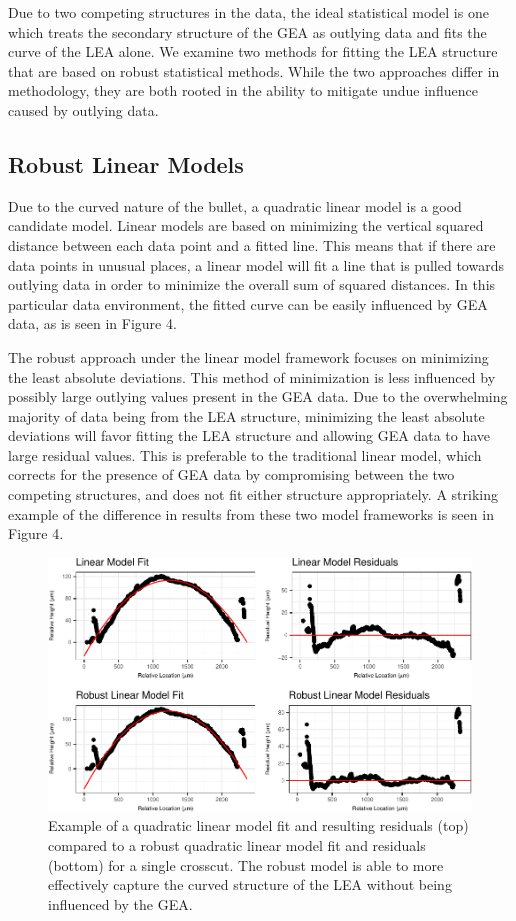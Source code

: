 \documentclass[12pt]{article}
\begin{document}
Due to two competing structures in the data, the ideal statistical model
is one which treats the secondary structure of the GEA as outlying data
and fits the curve of the LEA alone. We examine two methods for fitting
the LEA structure that are based on robust statistical methods. While
the two approaches differ in methodology, they are both rooted in the
ability to mitigate undue influence caused by outlying data.

\subsection{Robust Linear Models}

Due to the curved nature of the bullet, a quadratic linear model is a
good candidate model. Linear models are based on minimizing the vertical
squared distance between each data point and a fitted line. This means
that if there are data points in unusual places, a linear model will fit
a line that is pulled towards outlying data in order to minimize the
overall sum of squared distances. In this particular data environment,
the fitted curve can be easily influenced by GEA data, as is seen in
Figure 4.

The robust approach under the linear model framework focuses on
minimizing the least absolute deviations. This method of minimization is
less influenced by possibly large outlying values present in the GEA
data. Due to the overwhelming majority of data being from the LEA
structure, minimizing the least absolute deviations will favor fitting
the LEA structure and allowing GEA data to have large residual values.
This is preferable to the traditional linear model, which corrects for
the presence of GEA data by compromising between the two competing
structures, and does not fit either structure appropriately. A striking
example of the difference in results from these two model frameworks is
seen in Figure 4.

\begin{figure}[htbp]
\centering
\includegraphics{writeup_files/figure-latex/unnamed-chunk-3-1.pdf}
\caption{Example of a quadratic linear model fit and resulting residuals
(top) compared to a robust quadratic linear model fit and residuals
(bottom) for a single crosscut. The robust model is able to more
effectively capture the curved structure of the LEA without being
influenced by the GEA.}
\end{figure}
\end{document}
